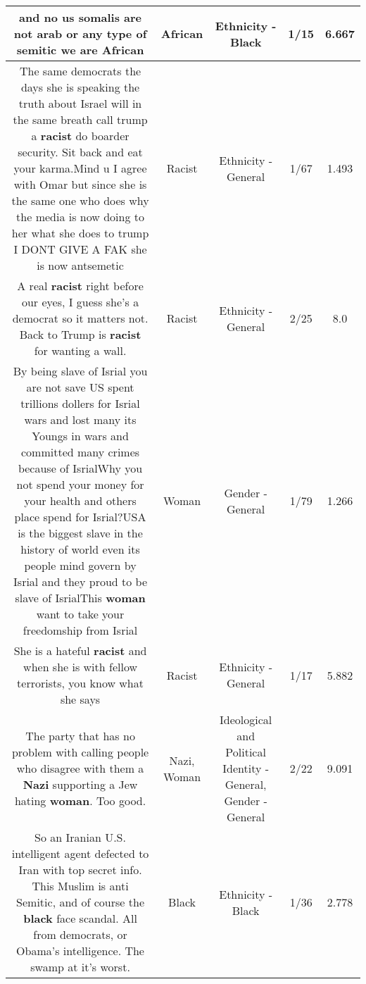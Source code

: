 \documentclass[11pt]{article}
\newlength\mylength
\begin{document}
\begin{center}
\begin{longtable}{|C{.65\mylength}|C{.30\mylength}|C{.12\mylength}|C{.12\mylength}|C{.12\mylength}|}
  \small and no us somalis are not arab or any type of semitic we are African\normalsize   & African & Ethnicity - Black & 1/15 & 6.667 \\  \hline
  \small The same democrats the days she is speaking the truth about Israel will in the same breath call trump a \textbf{racist} do boarder security. Sit back and eat your karma.Mind u I agree with Omar but since she is the same one who does why the media is now doing to her what she does to trump I DONT GIVE A FAK she is now antsemetic\normalsize   & Racist & Ethnicity - General & 1/67 & 1.493 \\  \hline
  \small A real \textbf{racist} right before our eyes, I guess she's a democrat so it matters not. Back to Trump is \textbf{racist} for wanting a wall.\normalsize   & Racist & Ethnicity - General & 2/25 & 8.0 \\  \hline
  \small By being slave of Isrial you are not save US spent trillions dollers for Isrial wars and lost many its Youngs in wars and committed many crimes because of IsrialWhy you not spend your money for your health and others place spend for Isrial?USA is the biggest slave in the history of world even its people mind govern by Isrial and they proud to be slave of IsrialThis \textbf{woman} want to take your freedomship from Isrial\normalsize   & Woman & Gender - General & 1/79 & 1.266 \\  \hline
  \small She is a hateful \textbf{racist} and when she is with fellow terrorists, you know what she says\normalsize   & Racist & Ethnicity - General & 1/17 & 5.882 \\  \hline
  \small The party that has no problem with calling people who disagree with them a \textbf{Nazi} supporting a Jew hating \textbf{woman}. Too good.\normalsize   & Nazi, Woman &  Ideological and Political Identity - General, Gender - General & 2/22 & 9.091 \\  \hline
  \small So an Iranian U.S. intelligent agent defected to Iran with top secret info. This Muslim is anti Semitic, and of course the \textbf{black} face scandal. All from democrats, or Obama's intelligence. The swamp at it's worst.\normalsize   & Black & Ethnicity - Black & 1/36 & 2.778 \\  \hline

\end{longtable}
\end{center}
\end{document}
